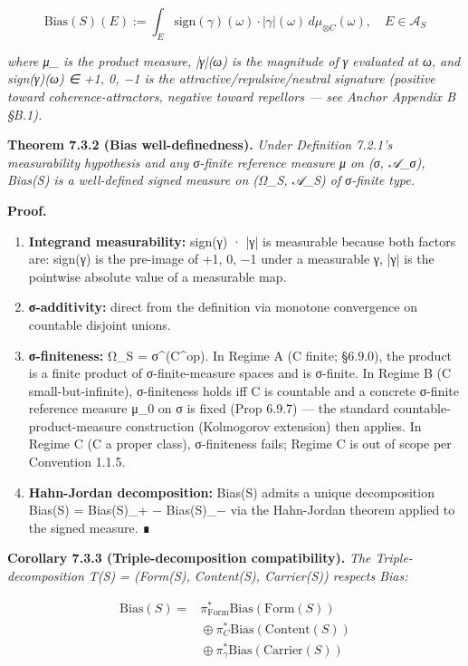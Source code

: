 \documentclass[11pt, openany]{book}
\begin{document}
\[
\mathrm{Bias}(S)(E) := \int_E \mathrm{sign}(\gamma)(\omega) \cdot |\gamma|(\omega) \, d\mu_{\otimes C}(\omega), \quad E \in \mathcal{A}_S
\]

\textit{where μ\_ is the product measure, |γ|(ω) is the magnitude of γ evaluated at ω, and sign(γ)(ω) ∈ {+1, 0, −1} is the attractive/repulsive/neutral signature (positive toward coherence-attractors, negative toward repellors --- see Anchor Appendix B §B.1).}

\textbf{Theorem 7.3.2 (Bias well-definedness).} \textit{Under Definition 7.2.1's measurability hypothesis and any σ-finite reference measure μ on (σ, 𝒜\_\allowbreak{}σ), Bias(S) is a well-defined signed measure on (Ω\_\allowbreak{}S, 𝒜\_\allowbreak{}S) of σ-finite type.}

\textbf{Proof.}
\begin{enumerate}
\item \textbf{Integrand measurability:} sign(γ) · |γ| is measurable because both factors are: sign(γ) is the pre-image of {+1, 0, −1} under a measurable γ, |γ| is the pointwise absolute value of a measurable map.
\item \textbf{σ-additivity:} direct from the definition via monotone convergence on countable disjoint unions.
\item \textbf{σ-finiteness:} Ω\_\allowbreak{}S = σ\textasciicircum{}(C\textasciicircum{}op). In Regime A (C finite; §6.9.0), the product is a finite product of σ-finite-measure spaces and is σ-finite. In Regime B (C small-but-infinite), σ-finiteness holds iff C is countable and a concrete σ-finite reference measure μ\_\allowbreak{}0 on σ is fixed (Prop 6.9.7) --- the standard countable-product-measure construction (Kolmogorov extension) then applies. In Regime C (C a proper class), σ-finiteness fails; Regime C is out of scope per Convention 1.1.5.
\item \textbf{Hahn-Jordan decomposition:} Bias(S) admits a unique decomposition Bias(S) = Bias(S)\_\allowbreak{}+ − Bias(S)\_\allowbreak{}− via the Hahn-Jordan theorem applied to the signed measure. ∎
\end{enumerate}

\textbf{Corollary 7.3.3 (Triple-decomposition compatibility).} \textit{The Triple-decomposition T(S) = (Form(S), Content(S), Carrier(S)) respects Bias:}

\[
\begin{aligned}
\mathrm{Bias}(S) = {} & \pi_{\mathrm{Form}}^* \mathrm{Bias}(\mathrm{Form}(S)) \\
& {} \oplus \pi_C^* \mathrm{Bias}(\mathrm{Content}(S)) \\
& {} \oplus \pi_\gamma^* \mathrm{Bias}(\mathrm{Carrier}(S))
\end{aligned}
\]
\end{document}
